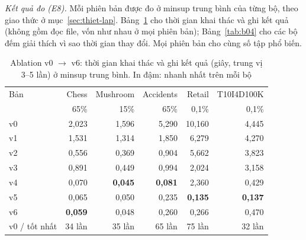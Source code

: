 \emph{Kết quả đo (E8).} Mỗi phiên bản được đo ở minsup trung bình của từng bộ, theo giao thức ở mục~\ref{sec:thiet-lap}. Bảng~\ref{tab:b03} cho thời gian khai thác và ghi kết quả (không gồm đọc file, vốn như nhau ở mọi phiên bản); Bảng~\ref{tab:b04} cho các bộ đếm giải thích vì sao thời gian thay đổi. Mọi phiên bản cho cùng số tập phổ biến.

\begin{table}[t]
\caption{Ablation v0 $\to$ v6: thời gian khai thác và ghi kết quả (giây, trung vị 3--5 lần) ở minsup trung bình. In đậm: nhanh nhất trên mỗi bộ}
\label{tab:b03}
\centering
\footnotesize
\setlength{\tabcolsep}{3.5pt}
\begin{tabular}{@{}lrrrrr@{}}
\toprule
Bản & Chess & Mushroom & Accidents & Retail & T10I4D100K \\
& 65\% & 15\% & 65\% & 0,1\% & 0,1\% \\
\midrule
v0 & 2,023 & 1,596 & 5,290 & 10,160 & 4,445 \\
v1 & 1,531 & 1,314 & 1,850 & 6,279 & 4,270 \\
v2 & 0,556 & 0,369 & 0,904 & 5,662 & 3,823 \\
v3 & 0,891 & 0,449 & 0,994 & 2,024 & 3,158 \\
v4 & 0,070 & \textbf{0,045} & \textbf{0,081} & 2,360 & 0,429 \\
v5 & 0,065 & 0,050 & 0,235 & \textbf{0,135} & \textbf{0,137} \\
v6 & \textbf{0,059} & 0,048 & 0,260 & 0,266 & 0,470 \\
\midrule
v0 / tốt nhất & 34 lần & 35 lần & 65 lần & 75 lần & 32 lần \\
\bottomrule
\end{tabular}
\end{table}


